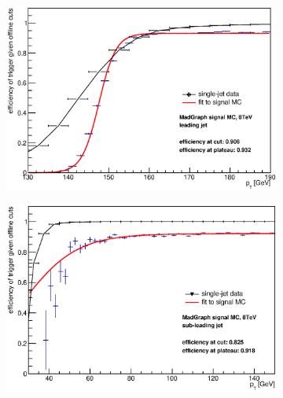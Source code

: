 \begin{figure}[phtb!]
  \begin{center}
  \begin{subfigure}[leading jet, $m_{A}=400$ GeV]{0.45\textwidth}\includegraphics[width=\textwidth]{Systematics/images/jet0_trigger_turn_on_all_j35.eps}\end{subfigure}
  \begin{subfigure}[sub-leading jet, $m_{A}=400$ GeV]{0.45\textwidth}\includegraphics[width=\textwidth]{Systematics/images/jet1_trigger_turn_on_all_j35.eps}\end{subfigure}

\end{center}
\end{figure}
